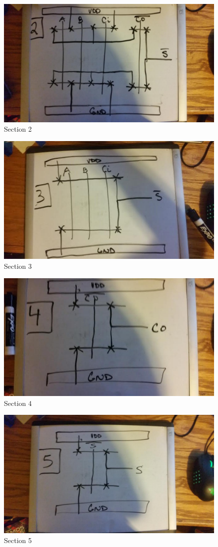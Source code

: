 \documentclass[12pt]{article}
\begin{document}
\begin{figure}[H]
\centering
\includegraphics[width=0.7\linewidth]{pre-2}
\caption{Section 2}
\label{fig:pre-2}
\end{figure}

\begin{figure}[H]
\centering
\includegraphics[width=0.7\linewidth]{pre-3}
\caption{Section 3}
\label{fig:pre-3}
\end{figure}


\begin{figure}[H]
\centering
\includegraphics[width=0.7\linewidth]{pre-4}
\caption{Section 4}
\label{fig:pre-4}
\end{figure}

\begin{figure}[H]
\centering
\includegraphics[width=0.7\linewidth]{pre-5}
\caption{Section 5}
\label{fig:pre-5}
\end{figure}
\end{document}
